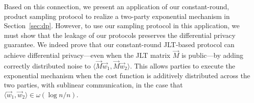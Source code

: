 Based on this connection, we present an application of our constant-round, product
sampling protocol to realize a two-party exponential mechanism in Section~\ref{sec:dp}.
%
However, to use our sampling protocol in this application, we must show
that the leakage of our protocols preserves the differential privacy
guarantee. We indeed prove that our constant-round JLT-based protocol
can achieve differential privacy---even when the JLT matrix $\vec{M}$ is
public---by adding correctly distributed noise to $\langle \vec{M}
\vec{w}_1, \vec{M} \vec{w}_2 \rangle$.  This allows parties to execute
the exponential mechanism when the cost function is additively
distributed across the two parties, with sublinear communication, in the
case that $\langle \vec{w}_1, \vec{w}_2 \rangle \in \omega(\log n/n)$.







